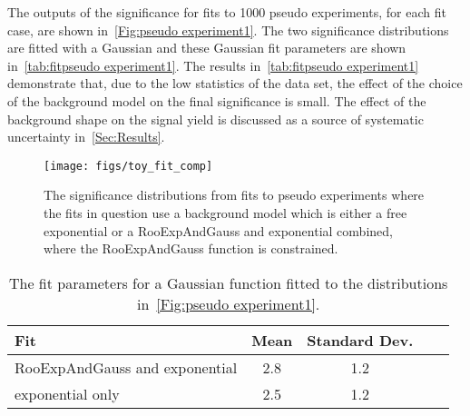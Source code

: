 The outputs of the significance for fits to 1000 pseudo experiments, for each fit case, are shown in~\autoref{Fig:pseudo experiment1}. The two significance distributions are fitted with a Gaussian and these Gaussian fit parameters are shown in~\autoref{tab:fitpseudo experiment1}. The results in~\autoref{tab:fitpseudo experiment1} demonstrate that, due to the low statistics of the data set, the effect of the choice of the background model on the final significance is small. The effect of the background shape on the signal yield is discussed as a source of systematic uncertainty in~\autoref{Sec:Results}.

\begin{figure}[!t]
  \centering
  \texttt{[image: figs/toy\_fit\_comp]}
  \caption{The significance distributions from fits to pseudo experiments where the fits in question use a background model which is either a free exponential or a RooExpAndGauss and exponential combined, where the RooExpAndGauss function is constrained.}
  \label{Fig:pseudo experiment1}
\end{figure}

\begin{table}[!h]
  \centering

  \begin{tabular}{l c c c c}
    \hline
    Fit& Mean& Standard Dev.\\
    \hline
    RooExpAndGauss and exponential & 2.8&1.2\\
    exponential only  & 2.5&1.2\\
    \hline
  \end{tabular}
  \caption{The fit parameters for a Gaussian function fitted to the distributions in~\autoref{Fig:pseudo experiment1}.}%
  \label{tab:fitpseudo experiment1}
\end{table}


